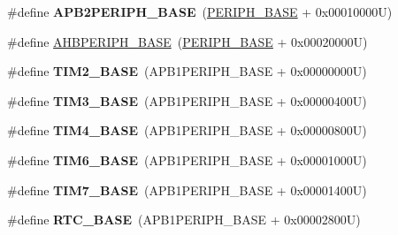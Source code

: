\begin{DoxyCompactItemize}
\item 
\hypertarget{group___peripheral__memory__map_ga25b99d6065f1c8f751e78f43ade652cb}{\#define {\bfseries A\-P\-B2\-P\-E\-R\-I\-P\-H\-\_\-\-B\-A\-S\-E}~(\hyperlink{group___peripheral__memory__map_ga9171f49478fa86d932f89e78e73b88b0}{P\-E\-R\-I\-P\-H\-\_\-\-B\-A\-S\-E} + 0x00010000\-U)}\label{group___peripheral__memory__map_ga25b99d6065f1c8f751e78f43ade652cb}

\item 
\#define \hyperlink{group___peripheral__memory__map_ga92eb5d49730765d2abd0f5b09548f9f5}{A\-H\-B\-P\-E\-R\-I\-P\-H\-\_\-\-B\-A\-S\-E}~(\hyperlink{group___peripheral__memory__map_ga9171f49478fa86d932f89e78e73b88b0}{P\-E\-R\-I\-P\-H\-\_\-\-B\-A\-S\-E} + 0x00020000\-U)
\item 
\hypertarget{group___peripheral__memory__map_ga00d0fe6ad532ab32f0f81cafca8d3aa5}{\#define {\bfseries T\-I\-M2\-\_\-\-B\-A\-S\-E}~(A\-P\-B1\-P\-E\-R\-I\-P\-H\-\_\-\-B\-A\-S\-E + 0x00000000\-U)}\label{group___peripheral__memory__map_ga00d0fe6ad532ab32f0f81cafca8d3aa5}

\item 
\hypertarget{group___peripheral__memory__map_gaf0c34a518f87e1e505cd2332e989564a}{\#define {\bfseries T\-I\-M3\-\_\-\-B\-A\-S\-E}~(A\-P\-B1\-P\-E\-R\-I\-P\-H\-\_\-\-B\-A\-S\-E + 0x00000400\-U)}\label{group___peripheral__memory__map_gaf0c34a518f87e1e505cd2332e989564a}

\item 
\hypertarget{group___peripheral__memory__map_ga56e2d44b0002f316527b8913866a370d}{\#define {\bfseries T\-I\-M4\-\_\-\-B\-A\-S\-E}~(A\-P\-B1\-P\-E\-R\-I\-P\-H\-\_\-\-B\-A\-S\-E + 0x00000800\-U)}\label{group___peripheral__memory__map_ga56e2d44b0002f316527b8913866a370d}

\item 
\hypertarget{group___peripheral__memory__map_ga8268ec947929f192559f28c6bf7d1eac}{\#define {\bfseries T\-I\-M6\-\_\-\-B\-A\-S\-E}~(A\-P\-B1\-P\-E\-R\-I\-P\-H\-\_\-\-B\-A\-S\-E + 0x00001000\-U)}\label{group___peripheral__memory__map_ga8268ec947929f192559f28c6bf7d1eac}

\item 
\hypertarget{group___peripheral__memory__map_ga0ebf54364c6a2be6eb19ded6b18b6387}{\#define {\bfseries T\-I\-M7\-\_\-\-B\-A\-S\-E}~(A\-P\-B1\-P\-E\-R\-I\-P\-H\-\_\-\-B\-A\-S\-E + 0x00001400\-U)}\label{group___peripheral__memory__map_ga0ebf54364c6a2be6eb19ded6b18b6387}

\item 
\hypertarget{group___peripheral__memory__map_ga4265e665d56225412e57a61d87417022}{\#define {\bfseries R\-T\-C\-\_\-\-B\-A\-S\-E}~(A\-P\-B1\-P\-E\-R\-I\-P\-H\-\_\-\-B\-A\-S\-E + 0x00002800\-U)}\label{group___peripheral__memory__map_ga4265e665d56225412e57a61d87417022}


\end{DoxyCompactItemize}
